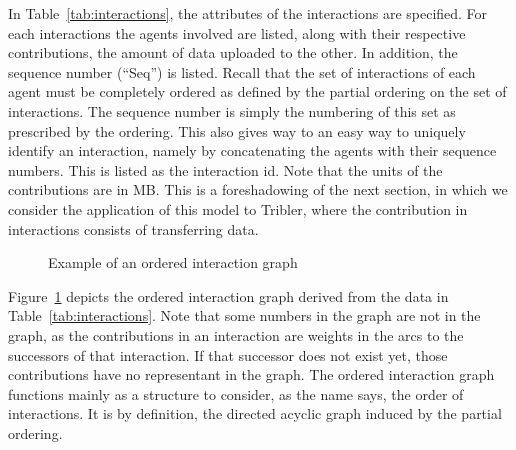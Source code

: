 \documentclass[a4paper,11pt]{book}
\theoremstyle{definition}
\begin{document}
In Table~\ref{tab:interactions}, the attributes of the interactions are specified. For each interactions the
agents involved are listed, along with their respective contributions, the amount of data uploaded
to the other. In addition, the sequence number (``Seq'') is listed. Recall that the set of interactions of each agent must
be completely ordered as defined by the partial ordering on the set of interactions. The sequence number is
simply the numbering of this set as prescribed by the ordering. This also gives way to an easy way to uniquely
identify an interaction, namely by concatenating the agents with their sequence numbers. This is listed
as the interaction id. Note that the units of the contributions are in MB. This is a foreshadowing of
the next section, in which we consider the application of this model to Tribler, where the contribution in
interactions consists of transferring data.

\begin{figure}[h]
    \centering
     \caption{Example of an ordered interaction graph}
     \label{fig:ex_oig}
\end{figure}

Figure~\ref{fig:ex_oig} depicts the ordered interaction graph derived from the data in Table~\ref{tab:interactions}.
Note that some numbers in the graph are not in the graph, as the contributions in an interaction are
weights in the arcs to the successors of that interaction. If that successor does not exist yet, those
contributions have no representant in the graph. The ordered interaction graph functions mainly as a 
structure to consider, as the name says, the order of interactions. It is by definition, the directed
acyclic graph induced by the partial ordering.
\end{document}
